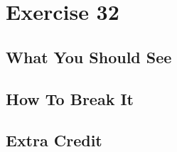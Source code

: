 \chapter{Exercise 32}


\section{What You Should See}


\section{How To Break It}


\section{Extra Credit}



